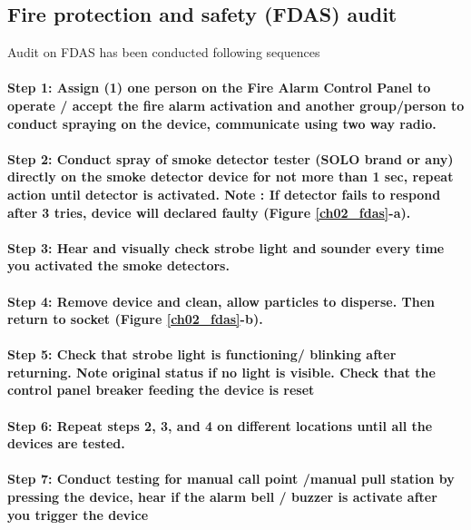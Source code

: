 \subsection{Fire protection and safety (FDAS) audit}
Audit on FDAS has been conducted following sequences

\paragraph{Step 1: Assign (1) one person on the Fire Alarm Control Panel  to operate / accept  the fire alarm activation and another group/person to conduct spraying on the device, communicate using two way radio.}

\paragraph{Step 2: Conduct spray of smoke detector tester (SOLO brand or any) directly on the smoke detector device for not more than 1 sec, repeat action until detector is activated. Note : If detector fails to respond after 3 tries,  device will declared faulty (Figure \ref{ch02_fdas}-a).}

\paragraph{Step 3: Hear and visually check strobe light and sounder every time you activated the smoke detectors.}

\paragraph{Step 4: Remove device and clean, allow particles to disperse. Then return to socket (Figure \ref{ch02_fdas}-b).}

\paragraph{Step 5: Check that strobe light is functioning/ blinking after returning. Note original status if no light is visible. Check that the control panel breaker feeding the device is reset}

\paragraph{Step 6: Repeat steps 2, 3, and 4 on different locations until all the devices are tested.}

\paragraph{Step 7: Conduct testing for manual call point /manual pull station by pressing the device, hear if the alarm bell / buzzer is activate after you trigger the device}

